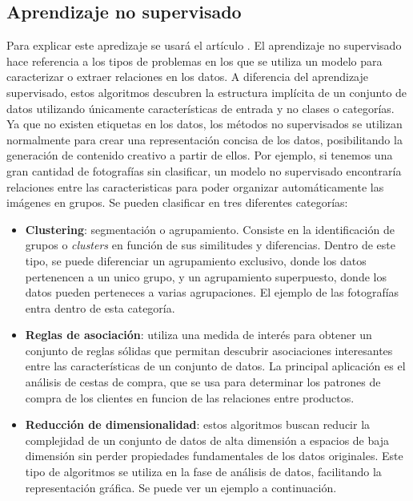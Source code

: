 \subsection{Aprendizaje no supervisado}
Para explicar este apredizaje se usará el artículo \cite{USL:guide}. El aprendizaje no supervisado hace referencia a los tipos de problemas en los que se utiliza un modelo para caracterizar o extraer relaciones en los datos.
A diferencia del aprendizaje supervisado, estos algoritmos descubren la estructura implícita de un conjunto de datos utilizando únicamente características de entrada y no clases o categorías. 
Ya que no existen etiquetas en los datos, los métodos no supervisados se utilizan normalmente para crear una representación concisa de los datos, posibilitando la generación de contenido creativo a partir de ellos. Por ejemplo, si tenemos una gran cantidad de fotografías sin clasificar, un modelo no supervisado encontraría relaciones entre las caracteristicas para poder organizar automáticamente las imágenes en grupos.
Se pueden clasificar en tres diferentes categorías:
\begin{itemize}
	\item \textbf{Clustering}: segmentación o agrupamiento. Consiste en la identificación de grupos o \textit{clusters} en función de sus similitudes y diferencias. Dentro de este tipo, se puede diferenciar un agrupamiento exclusivo, donde los datos pertenencen a un unico grupo, y un agrupamiento superpuesto, donde los datos pueden perteneces a varias agrupaciones. El ejemplo de las fotografías entra dentro de esta categoría.
	\item \textbf{Reglas de asociación}: utiliza una medida de interés para obtener un conjunto de reglas sólidas que permitan descubrir asociaciones interesantes entre las características de un conjunto de datos. La principal aplicación es el \guillemetleft análisis de cestas de compra\guillemetright, que se usa para determinar los patrones de compra de los clientes en funcion de las relaciones entre productos.
	\item \textbf{Reducción de dimensionalidad}: estos algoritmos buscan reducir la complejidad de un conjunto de datos de alta dimensión a espacios de baja dimensión sin perder propiedades fundamentales de los datos originales. Este tipo de algoritmos se utiliza en la fase de análisis de datos, facilitando la representación gráfica. Se puede ver un ejemplo a continuación.
\end{itemize}


